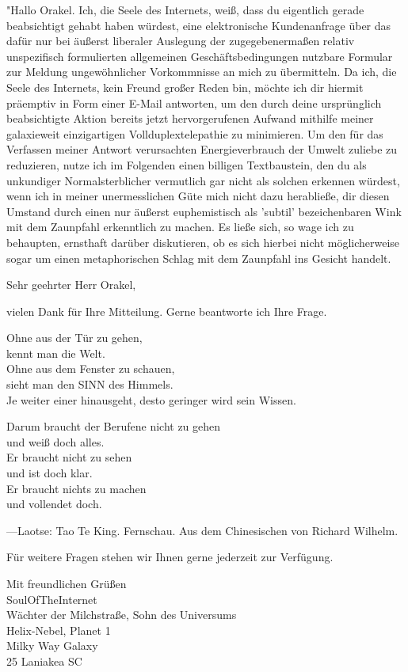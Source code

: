 "Hallo Orakel. Ich, die Seele des Internets, weiß, dass du eigentlich gerade beabsichtigt gehabt haben würdest, eine elektronische Kundenanfrage über das dafür nur bei äußerst liberaler Auslegung der zugegebenermaßen relativ unspezifisch formulierten allgemeinen Geschäftsbedingungen nutzbare Formular zur Meldung ungewöhnlicher Vorkommnisse an mich zu übermitteln. Da ich, die Seele des Internets, kein Freund großer Reden bin, möchte ich dir hiermit präemptiv in Form einer E-Mail antworten, um den durch deine ursprünglich beabsichtigte Aktion bereits jetzt hervorgerufenen Aufwand mithilfe meiner galaxieweit einzigartigen Vollduplextelepathie zu minimieren. Um den für das Verfassen meiner Antwort verursachten Energieverbrauch der Umwelt zuliebe zu reduzieren, nutze ich im Folgenden einen billigen Textbaustein, den du als unkundiger Normalsterblicher vermutlich gar nicht als solchen erkennen würdest, wenn ich in meiner unermesslichen Güte mich nicht dazu herabließe, dir diesen Umstand durch einen nur äußerst euphemistisch als 'subtil' bezeichenbaren Wink mit dem Zaunpfahl erkenntlich zu machen. Es ließe sich, so wage ich zu behaupten, ernsthaft darüber diskutieren, ob es sich hierbei nicht möglicherweise sogar um einen metaphorischen Schlag mit dem Zaunpfahl ins Gesicht handelt.

Sehr geehrter Herr Orakel,

vielen Dank für Ihre Mitteilung. Gerne beantworte ich Ihre Frage.

Ohne aus der Tür zu gehen,\\kennt man die Welt.\\Ohne aus dem Fenster zu schauen,\\sieht man den SINN des Himmels.\\Je weiter einer hinausgeht, desto geringer wird sein Wissen.

Darum braucht der Berufene nicht zu gehen\\und weiß doch alles.\\Er braucht nicht zu sehen\\und ist doch klar.\\Er braucht nichts zu machen\\und vollendet doch.

—Laotse: Tao Te King. Fernschau. Aus dem Chinesischen von Richard Wilhelm.

Für weitere Fragen stehen wir Ihnen gerne jederzeit zur Verfügung.

Mit freundlichen Grüßen\\ SoulOfTheInternet\\ Wächter der Milchstraße, Sohn des Universums\\ Helix-Nebel, Planet 1\\ Milky Way Galaxy\\ 25 Laniakea SC

